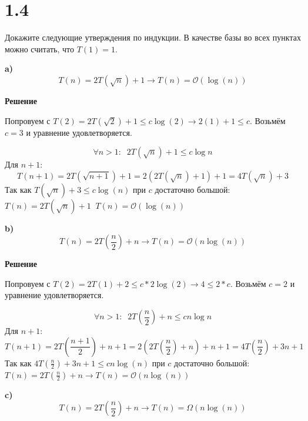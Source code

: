 \documentclass{article}
\begin{document}

\section*{1.4}
Докажите следующие утверждения по индукции. В качестве базы
во всех пунктах можно считать, что $T(1) = 1.$

\bigskip
\bigskip
\textbf{a)}
\begin{equation*}
    T(n) = 2T(\sqrt{n}) + 1 \longrightarrow T(n) = \mathcal{O} (\log (n))
\end{equation*}

\textbf{Решение}

Попровуем с $T(2) = 2T(\sqrt{2})+1 \leq c\log (2) \longrightarrow 2(1) + 1 \leq c$.
Возьмём $c = 3$ и уравнение удовлетворяется.

\begin{equation*}
    \forall n > 1 : \; \; 2T(\sqrt{n}) + 1 \leq c\log n
\end{equation*}
Для $n + 1$:
\begin{equation*}
    T(n + 1) = 2T(\sqrt{n + 1}) + 1 =  2(2T(\sqrt{n}) + 1) + 1 = 4T(\sqrt{n}) + 3
\end{equation*}
Так как $T(\sqrt{n}) + 3 \leq c\log (n)$ при $c$ достаточно большой:
$T(n) = 2T(\sqrt{n}) + 1 \;\; T(n) = \mathcal{O} (\log (n))$


\bigskip
\bigskip
\textbf{b)}
\begin{equation*}
    T(n) = 2T\left(\frac{n}{2}\right) + n \longrightarrow T(n) = \mathcal{O} (n\log (n))
\end{equation*}

\textbf{Решение}

Попровуем с $T(2) = 2T(1) + 2 \leq c*2\log (2) \longrightarrow 4 \leq 2*c$.
Возьмём $c = 2$ и уравнение удовлетворяется.

\begin{equation*}
    \forall n > 1 : \; \; 2T\left(\frac{n}{2}\right) + n \leq cn\log n
\end{equation*}
Для $n + 1$:
\begin{equation*}
    T(n + 1) = 2T\left(\frac{n + 1}{2}\right) + n + 1 =  2(2T\left(\frac{n}{2}\right) + n) + n + 1 = 4T\left(\frac{n}{2}\right) + 3n + 1
\end{equation*}
Так как $4T\left(\frac{n}{2}\right) + 3n + 1 \leq cn\log (n)$ при $c$ достаточно большой:
$T(n) = 2T\left(\frac{n}{2}\right) + n \longrightarrow T(n) = \mathcal{O} (n\log (n))$

\bigskip
\bigskip
\textbf{c)}
\begin{equation*}
    T(n) = 2T\left(\frac{n}{2}\right) + n \longrightarrow T(n) = \Omega (n\log (n))
\end{equation*}
\end{document}
